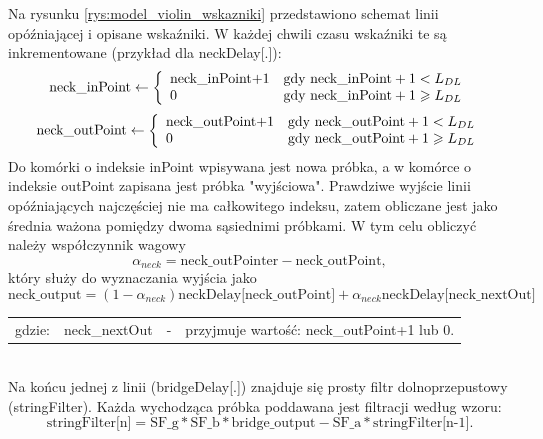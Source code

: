 Na rysunku \ref{rys:model_violin_wskazniki} przedstawiono schemat linii opóźniającej i opisane wskaźniki. W każdej chwili czasu wskaźniki te są inkrementowane (przykład dla neckDelay[.]):
\begin{equation} \label{equ:model_wskazniki}
\text{neck\_inPoint} \gets \left \{ 
\begin{array}{ l l}
\text{neck\_inPoint+1} &  \text{gdy neck\_inPoint}+1 < L_{DL} \\
0 &  \text{gdy neck\_inPoint}+1 \geqslant L_{DL}
\end{array}
\right.
\end{equation}
\begin{equation} \label{equ:model_wskazniki2}
\text{neck\_outPoint} \gets \left \{ 
\begin{array}{ l l}
\text{neck\_outPoint+1} &  \text{gdy neck\_outPoint}+1 < L_{DL} \\
0 &  \text{gdy neck\_outPoint}+1 \geqslant L_{DL}
\end{array}
\right.
\end{equation}
 Do komórki o indeksie inPoint wpisywana jest nowa próbka, a w komórce o indeksie outPoint zapisana jest próbka "wyjściowa". Prawdziwe wyjście linii opóźniających najczęściej nie ma całkowitego indeksu, zatem obliczane jest jako średnia ważona pomiędzy dwoma sąsiednimi próbkami. W tym celu obliczyć należy współczynnik wagowy
 \begin{equation} \label{equ:model_alpha}
\alpha_{neck} = \text{neck\_outPointer} - \text{neck\_outPoint},
 \end{equation}
który służy do wyznaczania wyjścia jako
 \begin{equation} \label{equ:model_neckoutput}
\text{neck\_output} = (1 - \alpha_{neck}) \text{neckDelay[neck\_outPoint]} + \alpha_{neck} \text{neckDelay[neck\_nextOut]}
\end{equation}
\begin{tabular}{ l l l l}
	gdzie: & neck\_nextOut & - & przyjmuje wartość: neck\_outPoint+1 lub 0. \\
\end{tabular} \\
Na końcu jednej z linii (bridgeDelay[.]) znajduje się prosty filtr dolnoprzepustowy (stringFilter). Każda wychodząca próbka poddawana jest filtracji według wzoru:
 \begin{equation} \label{equ:model_stringfilter}
\text{stringFilter[n]} = \text{SF}\_\text{g}*\text{SF}\_\text{b}*\text{bridge\_output} - \text{SF}\_\text{a}* \text{stringFilter[n-1]}.
\end{equation}
